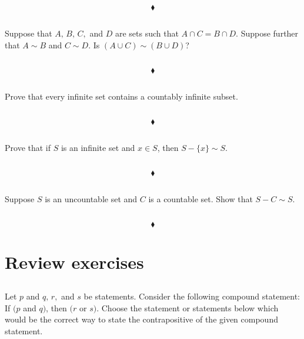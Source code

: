 $$\blacklozenge$$

\subsection{}
\begin{tcolorbox}
Suppose that $A,\, B,\, C,$ and $D$ are sets such that $A \cap C = B\cap D$. Suppose further that $A\sim  B$ and $C\sim  D$. Is $(A \cup C) \sim (B\cup  D)$? 
\end{tcolorbox}
$$ $$

$$\blacklozenge$$

\subsection{}
\begin{tcolorbox}
Prove that every infinite set contains a countably infinite subset. 
\end{tcolorbox}
$$ $$

$$\blacklozenge$$

\subsection{}
\begin{tcolorbox}
Prove that if $S$ is an infinite set and $x \in S$, then $S - \{x\} \sim S$. 
\end{tcolorbox}
$$ $$

$$\blacklozenge$$

\subsection{}
\begin{tcolorbox}
Suppose $S$ is an uncountable set and $C$ is a countable set. Show that $S - C\sim S$. 
\end{tcolorbox}
$$ $$

$$\blacklozenge$$

\newpage
\setcounter{section}{28}
 \section{Review exercises}
 \renewcommand{\thesubsection}{\thesection.\RomanNumeralCaps{1}}
\subsection{}
Let $p$ and $q,\, r,$ and $s$ be statements. Consider the following compound statement: If $(p$ and $q)$, then $(r$ or $s)$. Choose the statement or statements below which would be the correct way to state the contrapositive of the given compound statement.
\setcounter{secnumdepth}{4}


